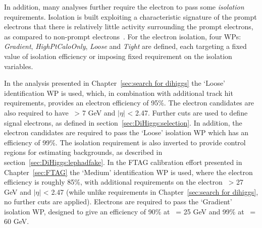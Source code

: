 In addition, many analyses further require the electron to pass
some \textit{isolation} requirements.
Isolation is built exploiting a characteristic signature 
of the prompt electrons that 
there is relatively little activity surrounding 
the prompt electrons, as compared to non-prompt electrons~\cite{EGAM-2018-01}. 
For the electron isolation, 
four WPs: \textit{Gradient}, \textit{HighPtCaloOnly}, \textit{Loose} and \textit{Tight} 
are defined, each targeting a fixed value of isolation efficiency
or imposing fixed requirement on the isolation variables. 

In the analysis presented in Chapter~\ref{sec:search for dihiggs} 
the `Loose' identification WP is used, which, in combination with 
additional track hit requirements, provides an electron efficiency of 95\%.
The electron candidates are also required to have \pt\ > 7 GeV and $|\eta|$ < 2.47.
Further cuts are used to define signal electrons, as defined in 
section~\ref{sec:DiHiggs:selection}. 
In addition, the electron candidates are required
to pass the `Loose' isolation WP which has an efficiency of 99\%. 
The isolation requirement is also 
inverted to provide control regions for estimating backgrounds, 
as described in section~\ref{sec:DiHiggs:lephadfake}.
In the FTAG calibration effort presented in Chapter~\ref{sec:FTAG} 
the `Medium' identification WP is used, where the electron efficiency is roughly
85\%, 
with additional requirements on the electron \pt\ > 27 GeV and $|\eta|$ < 2.47
(while unlike requirements in Chapter~\ref{sec:search for dihiggs},
no further cuts are applied).
Electrons are required to pass the `Gradient' isolation WP,
designed to give an efficiency of 90\% at \pt\ = 25 GeV and 99\% at \pt\ = 60 GeV.


